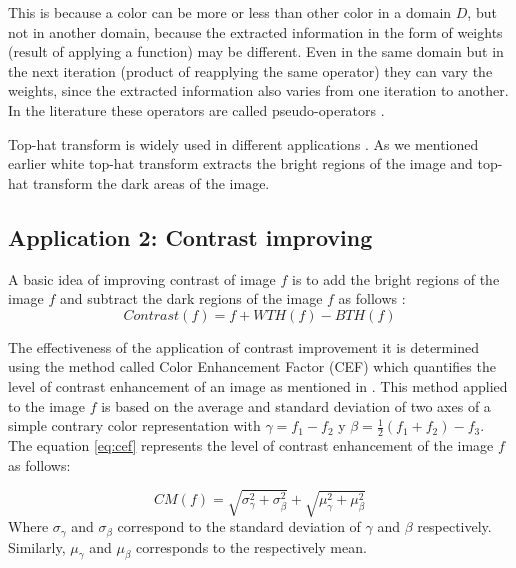 This is because a color can be more or less than other color in a domain $D$, but not in another domain, because the extracted information in the form of weights (result of applying a function) may be different. Even in the same domain but in the next iteration (product of reapplying the same operator) they can vary the weights, since the extracted information also varies from one iteration to another. In the literature these operators are called pseudo-operators \cite{hanbury2001morphological,aptoula2007pseudo,aptoula2008alpha,angulo2010pseudo,chen2002pseudo}. 

Top-hat transform is widely used in different applications \cite{soille2013morphological,mukhopadhyay2000multiscale,soille1997note,bai2010analysis,bai2010infrared,bai2010analysis1}. As we mentioned earlier white top-hat transform extracts the bright  regions of the image and  top-hat transform the dark areas of the image.

\subsection{Application 2: Contrast improving}
 A basic idea of improving contrast of image $f$ is to add the bright regions of the image $f$  and subtract the dark regions of the image $f$  as follows \cite{soille2013morphological}:
\begin{equation}
\label{contraste}
Contrast(f) = f + WTH(f) - BTH(f) 
\end{equation}


The effectiveness of the application of contrast improvement it is determined using the method called Color Enhancement Factor (CEF) which quantifies the level of contrast enhancement of an image as mentioned in \cite{susstrunk2003color}. This method applied to the image $f$ is based on the average and standard deviation of two axes of a simple contrary color representation with $\gamma = f_1 - f_2$ y $\beta = \frac{1}{2}(f_1 + f_2) - f_3$.
The equation \ref{eq:cef} represents the level of contrast enhancement of the image $f$ as follows:

\begin{equation}
CM(f)=\sqrt{\sigma_{\gamma}^{2} + \sigma_{\beta}^{2}} + \sqrt{\mu_{\gamma}^{2} + \mu_{\beta}^{2}}
\label{eq:cef}
\end{equation} Where $\sigma_{\gamma}$ and $\sigma_{\beta}$ correspond to the standard deviation of $\gamma$ and $\beta$ respectively. Similarly, $\mu_{\gamma}$ and $\mu_{\beta}$ corresponds to the respectively mean.

